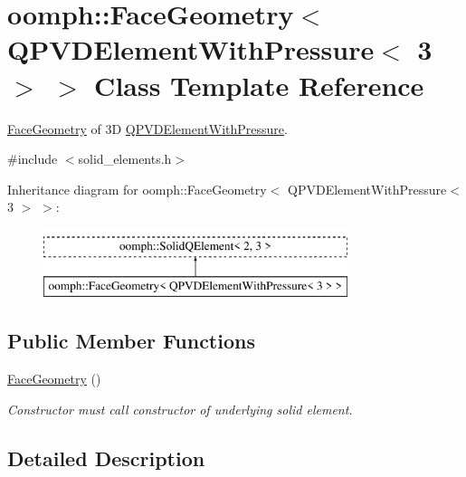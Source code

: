 \hypertarget{classoomph_1_1FaceGeometry_3_01QPVDElementWithPressure_3_013_01_4_01_4}{}\section{oomph\+:\+:Face\+Geometry$<$ Q\+P\+V\+D\+Element\+With\+Pressure$<$ 3 $>$ $>$ Class Template Reference}
\label{classoomph_1_1FaceGeometry_3_01QPVDElementWithPressure_3_013_01_4_01_4}


\hyperlink{classoomph_1_1FaceGeometry}{Face\+Geometry} of 3D \hyperlink{classoomph_1_1QPVDElementWithPressure}{Q\+P\+V\+D\+Element\+With\+Pressure}.  




{\ttfamily \#include $<$solid\+\_\+elements.\+h$>$}

Inheritance diagram for oomph\+:\+:Face\+Geometry$<$ Q\+P\+V\+D\+Element\+With\+Pressure$<$ 3 $>$ $>$\+:\begin{figure}[H]
\begin{center}
\leavevmode
\includegraphics[height=2.000000cm]{classoomph_1_1FaceGeometry_3_01QPVDElementWithPressure_3_013_01_4_01_4}
\end{center}
\end{figure}
\subsection*{Public Member Functions}
\begin{DoxyCompactItemize}
\item 
\hyperlink{classoomph_1_1FaceGeometry_3_01QPVDElementWithPressure_3_013_01_4_01_4_a907dc793bd7a1a7ede1267b0fce05780}{Face\+Geometry} ()
\begin{DoxyCompactList}\small\item\em Constructor must call constructor of underlying solid element. \end{DoxyCompactList}\end{DoxyCompactItemize}


\subsection{Detailed Description}
